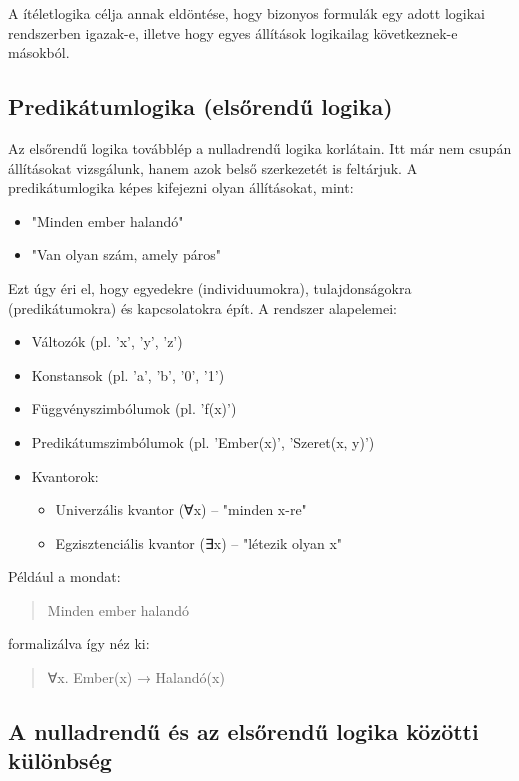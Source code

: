 A ítéletlogika célja annak eldöntése, hogy bizonyos formulák egy adott logikai rendszerben igazak-e, illetve hogy egyes állítások logikailag következnek-e másokból.

\subsection{Predikátumlogika (elsőrendű logika)}

Az elsőrendű logika továbblép a nulladrendű logika korlátain. Itt már nem csupán állításokat vizsgálunk, hanem azok belső szerkezetét is feltárjuk. A predikátumlogika képes kifejezni olyan állításokat, mint:

\begin{itemize}
\item "Minden ember halandó"
\item "Van olyan szám, amely páros"
\end{itemize}

Ezt úgy éri el, hogy egyedekre (individuumokra), tulajdonságokra (predikátumokra) és kapcsolatokra épít. A rendszer alapelemei:

\begin{itemize}
    \item Változók (pl. 'x', 'y', 'z')
    \item Konstansok (pl. 'a', 'b', '0', '1')
    \item Függvényszimbólumok (pl. 'f(x)')
    \item Predikátumszimbólumok (pl. 'Ember(x)', 'Szeret(x, y)')
    \item Kvantorok:
        \begin{itemize}
            \item Univerzális kvantor (∀x) – "minden x-re"
            \item Egzisztenciális kvantor (∃x) – "létezik olyan x"
        \end{itemize}
\end{itemize}

Például a mondat:  
\begin{quote}
Minden ember halandó
\end{quote} 
formalizálva így néz ki:
\begin{quote}
∀x. Ember(x) → Halandó(x)
\end{quote}

\subsection{A nulladrendű és az elsőrendű logika közötti különbség}

